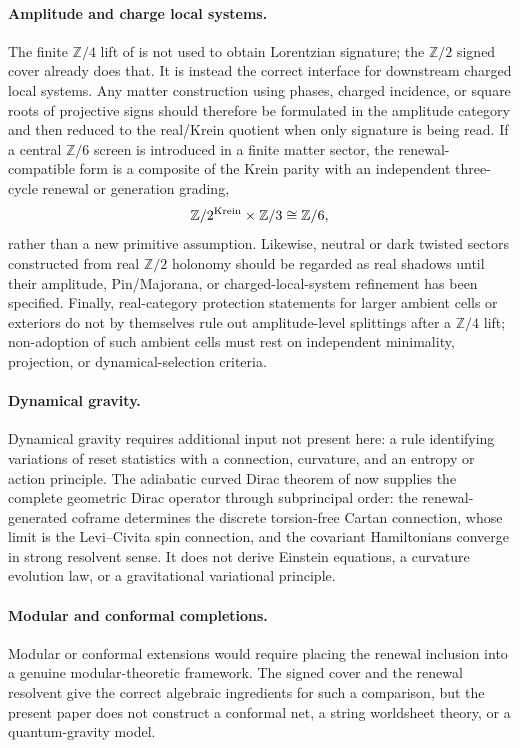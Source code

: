 \documentclass[11pt]{article}
\theoremstyle{definition}
\theoremstyle{remark}
\newcommand{\Z}{\mathbb{Z}}
\newcommand{\Ztwo}{\mathbb{Z}/2}
\newcommand{\Zfour}{\mathbb{Z}/4}
\newcommand{\Zsix}{\mathbb{Z}/6}
\begin{document}
\paragraph{Amplitude and charge local systems.}
The finite \(\Zfour\) lift of  is not used to
obtain Lorentzian signature; the \(\Ztwo\) signed cover already does that.  It is
instead the correct interface for downstream charged local systems.  Any matter
construction using phases, charged incidence, or square roots of projective
signs should therefore be formulated in the amplitude category and then reduced
to the real/Krein quotient when only signature is being read.  If a central
\(\Zsix\) screen is introduced in a finite matter sector, the renewal-compatible
form is a composite of the Krein parity with an independent three-cycle renewal
or generation grading,
\[
  \Ztwo^{\rm Krein}\times\Z/3\cong\Zsix,
\]
rather than a new primitive assumption.  Likewise, neutral or dark twisted
sectors constructed from real \(\Ztwo\) holonomy should be regarded as real
shadows until their amplitude, Pin/Majorana, or charged-local-system refinement
has been specified.  Finally, real-category protection statements for larger
ambient cells or exteriors do not by themselves rule out amplitude-level
splittings after a \(\Zfour\) lift; non-adoption of such ambient cells must rest
on independent minimality, projection, or dynamical-selection criteria.

\paragraph{Dynamical gravity.}
Dynamical gravity requires additional input not present here: a rule identifying
variations of reset statistics with a connection, curvature, and an entropy or
action principle.  The adiabatic curved Dirac theorem of
 now supplies the complete geometric Dirac operator
through subprincipal order: the renewal-generated coframe determines the
discrete torsion-free Cartan connection, whose limit is the Levi--Civita spin
connection, and the covariant Hamiltonians converge in strong resolvent sense.
It does not derive Einstein equations, a curvature evolution law, or a
gravitational variational principle.

\paragraph{Modular and conformal completions.}
Modular or conformal extensions would require placing the renewal inclusion into
a genuine modular-theoretic framework.  The signed cover and the renewal
resolvent give the correct algebraic ingredients for such a comparison, but the
present paper does not construct a conformal net, a string worldsheet theory, or
a quantum-gravity model.
\end{document}
